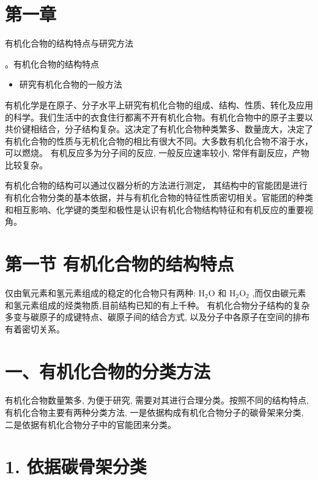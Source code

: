 \documentclass[10pt]{article}
\begin{document}
\section*{第一章}

有机化合物的结构特点与研究方法

\begin{mdframed}

。有机化合物的结构特点

\begin{itemize}
\item 研究有机化合物的一般方法
\end{itemize}

\end{mdframed}

有机化学是在原子、分子水平上研究有机化合物的组成、结构、性质、转化及应用的科学。我们生活中的衣食住行都离不开有机化合物。有机化合物中的原子主要以共价键相结合，分子结构复杂。这决定了有机化合物种类繁多、数量庞大，决定了有机化合物的性质与无机化合物的相比有很大不同。大多数有机化合物不溶于水，可以燃烧。 有机反应多为分子间的反应, 一般反应速率较小, 常伴有副反应，产物比较复杂。

有机化合物的结构可以通过仪器分析的方法进行测定， 其结构中的官能团是进行有机化合物分类的基本依据，并与有机化合物的特征性质密切相关。官能团的种类和相互影响、化学键的类型和极性是认识有机化合物结构特征和有机反应的重要视角。

\section*{第一节 有机化合物的结构特点}

仅由氧元素和氢元素组成的稳定的化合物只有两种: \({\mathrm{H}}_{2}\mathrm{O}\) 和 \({\mathrm{H}}_{2}{\mathrm{O}}_{2}\) ,而仅由碳元素和氢元素组成的烃类物质,目前结构已知的有上千种。 有机化合物分子结构的复杂多变与碳原子的成键特点、碳原子间的结合方式, 以及分子中各原子在空间的排布有着密切关系。

\section*{一、有机化合物的分类方法}

有机化合物数量繁多, 为便于研究, 需要对其进行合理分类。按照不同的结构特点, 有机化合物主要有两种分类方法, 一是依据构成有机化合物分子的碳骨架来分类, 二是依据有机化合物分子中的官能团来分类。

\section*{1. 依据碳骨架分类}
\end{document}
